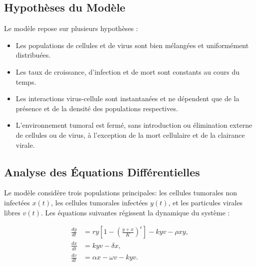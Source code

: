 \documentclass{article}
\begin{document}
\subsection{Hypothèses du Modèle}
Le modèle repose sur plusieurs hypothèses :
\begin{itemize}
  \item Les populations de cellules et de virus sont bien mélangées et uniformément distribuées.
  \item Les taux de croissance, d'infection et de mort sont constants au cours du temps.
  \item Les interactions virus-cellule sont instantanées et ne dépendent que de la présence et de la densité des populations respectives.
  \item L'environnement tumoral est fermé, sans introduction ou élimination externe de cellules ou de virus, à l'exception de la mort cellulaire et de la clairance virale.
\end{itemize}

\subsection{Analyse des Équations Différentielles}
Le modèle considère trois populations principales: les cellules tumorales non infectées \( x(t) \), les cellules tumorales infectées \( y(t) \), et les particules virales libres \( v(t) \). Les équations suivantes régissent la dynamique du système :

\begin{align}
    \frac{dy}{dt} &= ry\left[1 - \left(\frac{y + x}{K}\right)^\epsilon\right] - kyv - \rho xy, \\
    \frac{dx}{dt} &= kyv - \delta x, \\
    \frac{dv}{dt} &= \alpha x - \omega v - kyv.
\end{align}
\end{document}
